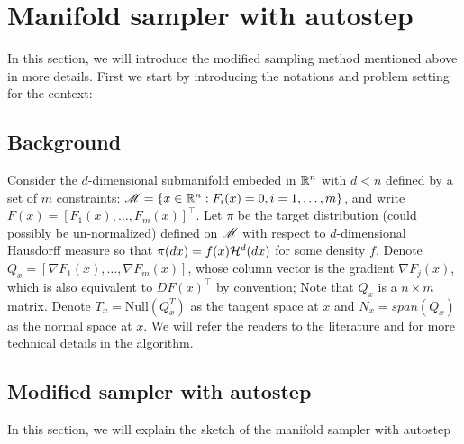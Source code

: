 \documentclass{article}
\begin{document}


\section{Manifold sampler with autostep}
In this section, we will introduce the modified sampling method mentioned above in more details. First we start by introducing the notations and problem setting for the context:
\subsection{Background}
Consider the $d$-dimensional submanifold embeded in $\mathbb R^n$ with $d < n$ defined by a set of $m$ constraints: $\mathscr{M} = \{x \in \mathbb R^n : F_i(x) = 0, i = 1,\ldots, m\}$, and write $F(x) = [F_1(x),\ldots, F_m(x)]^\top$. Let $\pi$ be the target distribution (could possibly be un-normalized) defined on $\mathscr{M}$ with respect to $d$-dimensional Hausdorff measure so that $\pi(dx) = f(x) {\cal H}^{d}(dx)$ for some density $f$.
Denote $Q_x = [\nabla F_1(x), \ldots, \nabla F_m(x)]$, whose column vector is the gradient $\nabla F_j(x)$, which is also equivalent to $DF(x)^\top$ by convention; Note that $Q_x$ is a $n \times m$ matrix. Denote $T_x = \text{Null}(Q_x^T)$ as the tangent space at $x$ and $N_x = span(Q_x)$ as the normal space at $x$. We will refer the readers to the literature \cite{manifoldparent} and \cite{manifoldchild} for more technical details in the algorithm.

\subsection{Modified sampler with autostep}
In this section, we will explain the sketch of the manifold sampler with autostep
\end{document}
